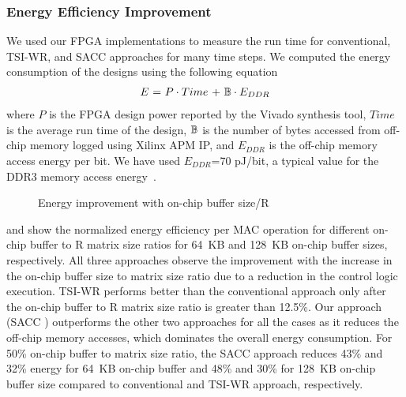 {{{{\subsubsection{Energy Efficiency Improvement}
We used our FPGA implementations to measure the run time for conventional, TSI-WR, and SACC approaches for many time steps. We computed the energy consumption of the designs using the following equation~\cite{tu2017deep}
\begin{align}\label{eq:energyEfficiency}
	E~{=}~P\cdot Time~{+}~\mathbb{B}\cdot E_{DDR}
\end{align}
where $P$ is the FPGA design power reported by the Vivado synthesis tool, $Time$ is the average run time of the design, $\mathbb{B}$ is the number of bytes accessed from off-chip memory logged using Xilinx APM IP, and $E_{DDR}$ is the off-chip memory access energy per bit. We have used $E_{DDR}$=70 pJ/bit, a typical value for the DDR3 memory access energy~\cite{6237004}.
\begin{figure}[htb!]
	\centering
	\hspace{2.0em}
	\caption{Energy improvement with on-chip buffer size/R}\label{fig:energyVsMem}
\end{figure}
 and  show the normalized energy efficiency per MAC operation for different on-chip buffer to R matrix size ratios for 64~KB and 128~KB on-chip buffer sizes, respectively. All three approaches observe the improvement with the increase in the on-chip buffer size to matrix size ratio due to a reduction in the control logic execution. TSI-WR performs better than the conventional approach only after the on-chip buffer to R matrix size ratio is greater than 12.5\%. Our approach (SACC ) outperforms the other two approaches for all the cases as it reduces the off-chip memory accesses, which dominates the overall energy consumption. For 50\% on-chip buffer to matrix size ratio, the SACC approach reduces 43\% and 32\% energy for 64~KB on-chip buffer and 48\% and 30\% for 128~KB on-chip buffer size compared to conventional and TSI-WR approach, respectively.

}}}}
